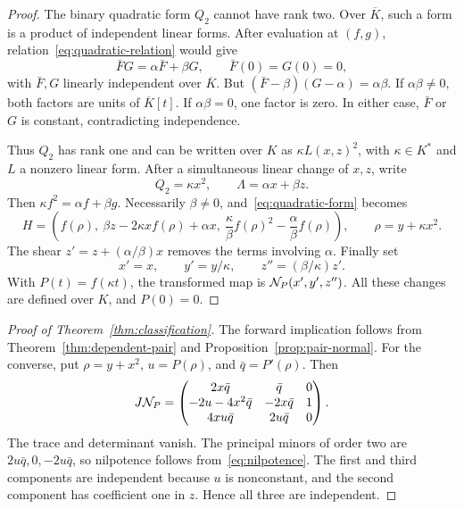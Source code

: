 \begin{proof}
The binary quadratic form $Q_2$ cannot have rank two. Over $\overline K$, such a form is a product of independent linear forms. After evaluation at $(f,g)$, relation~\eqref{eq:quadratic-relation} would give
\[
  \bar{F}G=\alpha \bar{F}+\beta G,\qquad \bar{F}(0)=G(0)=0,
\]
with $\bar{F},G$ linearly independent over $ \overline K$. But
$(\bar{F}-\beta)(G-\alpha)=\alpha\beta$. If $\alpha\beta\neq0$, both factors are units of $\overline K[t]$. If $\alpha\beta=0$, one factor is zero. In either case, $\bar{F}$ or $G$ is constant, contradicting independence.

Thus $Q_2$ has rank one and can be written over $K$ as $\kappa L(x,z)^2$, with $\kappa\in K^*$ and $L$ a nonzero linear form. After a simultaneous linear change of $x,z$, write
\[
 Q_2=\kappa x^2,\qquad \Lambda=\alpha x+\beta z.
\]
Then $\kappa f^2=\alpha f+\beta g$. Necessarily $\beta\neq0$, and~\eqref{eq:quadratic-form} becomes
\begin{equation}\label{eq:precanonical}
 H=\left(f(\rho),\ \beta z-2\kappa xf(\rho)+\alpha x,
 \ \frac{\kappa}{\beta}f(\rho)^2-\frac{\alpha}{\beta}f(\rho)\right),
 \qquad \rho=y+\kappa x^2.
\end{equation}
The shear $z'=z+(\alpha/\beta)x$ removes the terms involving $\alpha$. Finally set
\[
 x'=x,\qquad y'=y/\kappa,\qquad z''=(\beta/\kappa)z'.
\]
With $P(t)=f(\kappa t)$, the transformed map is $\mathcal N_P(x',y',z'')$. All these changes are defined over $K$, and $P(0)=0$.
\end{proof}

\begin{proof}[Proof of Theorem~\ref{thm:classification}]
The forward implication follows from Theorem~\ref{thm:dependent-pair} and Proposition~\ref{prop:pair-normal}. For the converse, put $\rho=y+x^2$, $u=P(\rho)$, and $\bar{q}=P'(\rho)$. Then
\begin{equation}\label{eq:canonical-J}
 J\mathcal N_P=
 \begin{pmatrix}
 2x\bar{q}&\bar{q}&0\\
 -2u-4x^2\bar{q}&-2x\bar{q}&1\\
 4xu\bar{q}&2u\bar{q}&0
 \end{pmatrix}.
\end{equation}
The trace and determinant vanish. The principal minors of order two are $2u\bar{q},0,-2u\bar{q}$, so nilpotence follows from~\eqref{eq:nilpotence}. The first and third components are independent because $u$ is nonconstant, and the second component has coefficient one in $z$. Hence all three are independent.
\end{proof}

